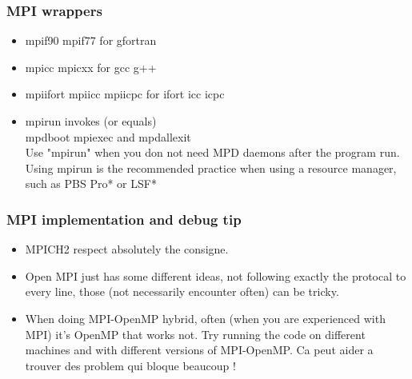 \documentclass{beamer}
\begin{document}

\begin{frame}
\frametitle{MPI wrappers}
\begin{itemize}
	\item mpif90 mpif77 for gfortran

	\item mpicc mpicxx for gcc g++

	\item mpiifort mpiicc mpiicpc for ifort icc icpc

	\item mpirun invokes (or equals) \\
mpdboot mpiexec and mpdallexit \\
Use "mpirun" when you don not need MPD daemons after the program run. \\
Using mpirun is the recommended practice when using a resource manager, such as PBS Pro* or LSF*
\end{itemize}
\end{frame}

\begin{frame}
\frametitle{MPI implementation and debug tip}
\begin{itemize}
	\item MPICH2 respect absolutely the consigne.
	\item Open MPI just has some different ideas, not following exactly the protocal to every line, those (not necessarily encounter often) can be tricky.
	\item When doing MPI-OpenMP hybrid, often (when you are experienced with MPI) it's OpenMP that works not. Try running the code on different machines and with different versions of MPI-OpenMP. Ca peut aider a trouver des problem qui bloque beaucoup !
\end{itemize}
\end{frame}

\end{document}
